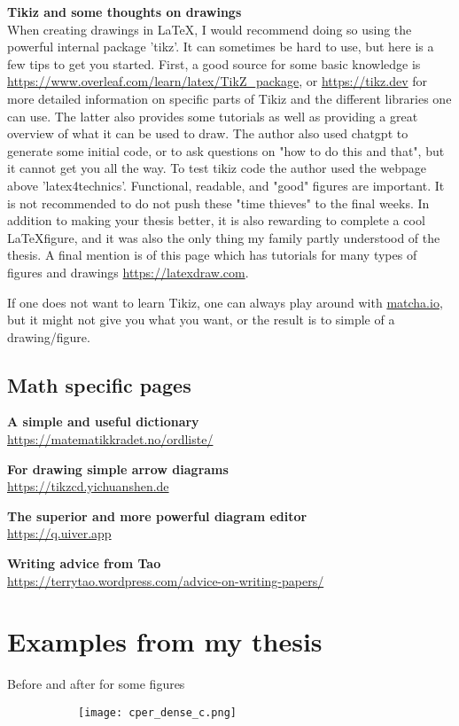 \documentclass[../thesis.tex]{subfiles}
\begin{document}
\textbf{Tikiz and some thoughts on drawings}\\
When creating drawings in \LaTeX, I would recommend doing so using the powerful internal package 'tikz'. It can sometimes be hard to use, but here is a few tips to get you started. First, a good source for some basic knowledge is \url{https://www.overleaf.com/learn/latex/TikZ_package}, or \url{https://tikz.dev} for more detailed information on specific parts of Tikiz and the different libraries one can use. The latter also provides some tutorials as well as providing a great overview of what it can be used to draw. The author also used chatgpt to generate some initial code, or to ask questions on "how to do this and that", but it cannot get you all the way. To test tikiz code the author used the webpage above 'latex4technics'. Functional, readable, and "good" figures are important. It is not recommended to do not push these "time thieves" to the final weeks. In addition to making your thesis better, it is also rewarding to complete a cool \LaTeX figure, and it was also the only thing my family partly understood of the thesis. A final mention is of this page which has tutorials for many types of figures and drawings \url{https://latexdraw.com}.

If one does not want to learn Tikiz, one can always play around with \href{https://www.mathcha.io/editor/vwPs1KFnvu2vIy2#}{matcha.io}, but it might not give you what you want, or the result is to simple of a drawing/figure. 


\subsection{Math specific pages}

\textbf{A simple and useful dictionary}\\
\url{https://matematikkradet.no/ordliste/}

\textbf{For drawing simple arrow diagrams}\\
\url{https://tikzcd.yichuanshen.de}

\textbf{The superior and more powerful diagram editor}\\
\url{https://q.uiver.app}

\textbf{Writing advice from Tao}\\
\url{https://terrytao.wordpress.com/advice-on-writing-papers/}



\section{Examples from my thesis}
Before and after for some figures
\begin{figure}[h!]%
    \centering
    \begin{subfigure}{.45\textwidth}
        \texttt{[image: cper\_dense\_c.png]}
    \end{subfigure}\quad
    \begin{subfigure}{.45\textwidth}
        
    \end{subfigure}
\end{figure}
\end{document}
